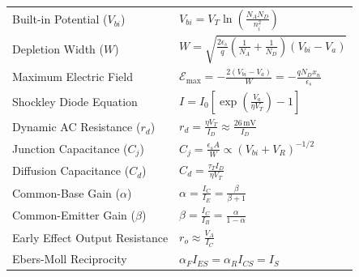 \documentclass[12pt,a4paper]{article}
\renewcommand{\arraystretch}{1.45}
\begin{document}
\begin{tcolorbox}[formulabox, title={\textbf{Key Formulas and Metrics at a Glance}}]
\renewcommand{\arraystretch}{1.35}
\begin{tabularx}{\linewidth}{B{5.0cm} X}
Built-in Potential ($V_{bi}$) & $V_{bi} = V_T \ln\left(\frac{N_A N_D}{n_i^2}\right)$ \\[4pt]
Depletion Width ($W$) & $W = \sqrt{\frac{2\epsilon_s}{q}\left(\frac{1}{N_A} + \frac{1}{N_D}\right)(V_{bi} - V_a)}$ \\[4pt]
Maximum Electric Field & $\mathcal{E}_{\text{max}} = -\frac{2(V_{bi} - V_a)}{W} = -\frac{q N_D x_n}{\epsilon_s}$ \\[4pt]
Shockley Diode Equation & $I = I_0 \left[ \exp\left(\frac{V_a}{\eta V_T}\right) - 1 \right]$ \\[4pt]
Dynamic AC Resistance ($r_d$) & $r_d = \frac{\eta V_T}{I_D} \approx \frac{26\,\text{mV}}{I_D}$ \\[4pt]
Junction Capacitance ($C_j$) & $C_j = \frac{\epsilon_s A}{W} \propto (V_{bi} + V_R)^{-1/2}$ \\[4pt]
Diffusion Capacitance ($C_d$) & $C_d = \frac{\tau_T I_D}{\eta V_T}$ \\[4pt]
Common-Base Gain ($\alpha$) & $\alpha = \frac{I_C}{I_E} = \frac{\beta}{\beta + 1}$ \\[4pt]
Common-Emitter Gain ($\beta$) & $\beta = \frac{I_C}{I_B} = \frac{\alpha}{1 - \alpha}$ \\[4pt]
Early Effect Output Resistance & $r_o \approx \frac{V_A}{I_C}$ \\[4pt]
Ebers-Moll Reciprocity & $\alpha_F I_{ES} = \alpha_R I_{CS} = I_S$ \\[4pt]
\end{tabularx}
\end{tcolorbox}
\end{document}
